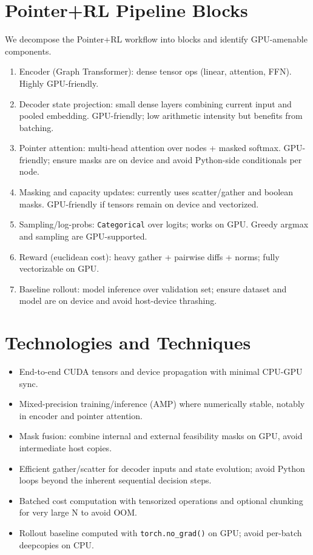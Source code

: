 \documentclass[11pt]{article}
\begin{document}
\section{Pointer+RL Pipeline Blocks}
We decompose the Pointer+RL workflow into blocks and identify GPU-amenable components.
\begin{enumerate}[label=B\arabic*:, leftmargin=*]
  \item Encoder (Graph Transformer): dense tensor ops (linear, attention, FFN). Highly GPU-friendly.
  \item Decoder state projection: small dense layers combining current input and pooled embedding. GPU-friendly; low arithmetic intensity but benefits from batching.
  \item Pointer attention: multi-head attention over nodes + masked softmax. GPU-friendly; ensure masks are on device and avoid Python-side conditionals per node.
  \item Masking and capacity updates: currently uses scatter/gather and boolean masks. GPU-friendly if tensors remain on device and vectorized.
  \item Sampling/log-probs: \texttt{Categorical} over logits; works on GPU. Greedy argmax and sampling are GPU-supported.
  \item Reward (euclidean cost): heavy gather + pairwise diffs + norms; fully vectorizable on GPU.
  \item Baseline rollout: model inference over validation set; ensure dataset and model are on device and avoid host-device thrashing.
\end{enumerate}

\section{Technologies and Techniques}
\begin{itemize}[noitemsep]
  \item End-to-end CUDA tensors and device propagation with minimal CPU-GPU sync.
  \item Mixed-precision training/inference (AMP) where numerically stable, notably in encoder and pointer attention.
  \item Mask fusion: combine internal and external feasibility masks on GPU, avoid intermediate host copies.
  \item Efficient gather/scatter for decoder inputs and state evolution; avoid Python loops beyond the inherent sequential decision steps.
  \item Batched cost computation with tensorized operations and optional chunking for very large N to avoid OOM.
  \item Rollout baseline computed with \texttt{torch.no_grad()} on GPU; avoid per-batch deepcopies on CPU.
\end{itemize}
\end{document}
